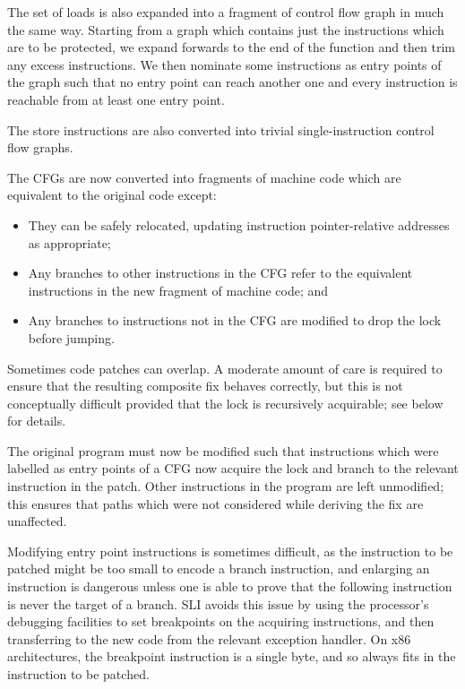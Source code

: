 \documentclass[10pt,letter,twocolumn]{sigplanconf}
\begin{document}
The set of loads is also expanded into a fragment of control flow
graph in much the same way.  Starting from a graph which contains just
the instructions which are to be protected, we expand forwards to the
end of the function and then trim any excess instructions.  We then
nominate some instructions as entry points of the graph such that no
entry point can reach another one and every instruction is reachable
from at least one entry point.

The store instructions are also converted into trivial
single-instruction control flow graphs.

The CFGs are now converted into fragments of machine code which are
equivalent to the original code except:

\begin{itemize}
\item They can be safely relocated, updating instruction pointer-relative
  addresses as appropriate;
\item Any branches to other instructions in the CFG refer to the
  equivalent instructions in the new fragment of machine code; and
\item Any branches to instructions not in the CFG are modified to
  drop the lock before jumping.
\end{itemize}

\noindent
Sometimes code patches can overlap.  A moderate amount of care is
required to ensure that the resulting composite fix behaves correctly,
but this is not conceptually difficult provided that the lock is
recursively acquirable; see below for details.

The original program must now be modified such that instructions which
were labelled as entry points of a CFG now acquire the lock and branch
to the relevant instruction in the patch.  Other instructions in the
program are left unmodified; this ensures that paths which were not
considered while deriving the fix are unaffected.

Modifying entry point instructions is sometimes difficult, as the
instruction to be patched might be too small to encode a branch
instruction, and enlarging an instruction is dangerous unless one is
able to prove that the following instruction is never the target of a
branch.  SLI avoids this issue by using the processor's debugging
facilities to set breakpoints on the acquiring instructions, and then
transferring to the new code from the relevant exception handler.  On
x86 architectures, the breakpoint instruction is a single byte, and so
always fits in the instruction to be patched.
\end{document}
